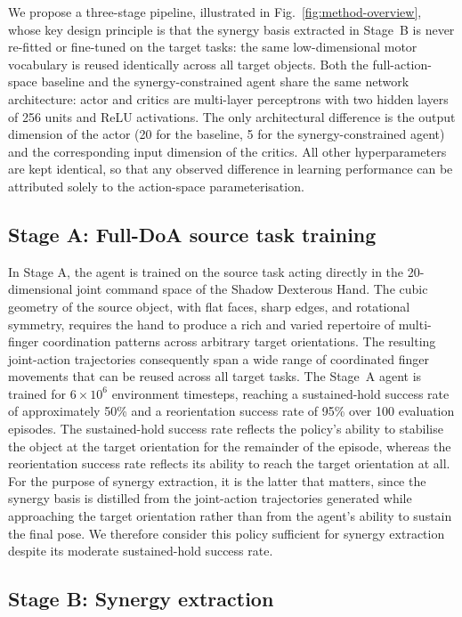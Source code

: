 \documentclass[letterpaper, 10 pt, conference]{ieeeconf}  %
\begin{document}
We propose a three-stage pipeline, illustrated in 
Fig.~\ref{fig:method-overview}, whose key design principle is that the 
synergy basis extracted in Stage~B is never re-fitted or fine-tuned on 
the target tasks: the same low-dimensional motor vocabulary is reused 
identically across all target objects. Both the full-action-space 
baseline and the synergy-constrained agent share the same network 
architecture: actor and critics are multi-layer perceptrons with two 
hidden layers of 256 units and ReLU activations. The only architectural 
difference is the output dimension of the actor (20 for the baseline, 
5 for the synergy-constrained agent) and the corresponding input 
dimension of the critics. All other hyperparameters are kept identical, 
so that any observed difference in learning performance can be attributed 
solely to the action-space parameterisation.

\subsection{Stage A: Full-DoA source task training}

In Stage A, the agent is trained on the source task acting directly in the 20-dimensional joint command space of the Shadow Dexterous Hand. The cubic geometry of the source object, with flat faces, sharp edges, 
and rotational symmetry, requires the hand to produce a rich and 
varied repertoire of multi-finger coordination patterns across arbitrary 
target orientations. The resulting joint-action trajectories consequently span a wide range of coordinated finger movements that can be reused across all target tasks. The Stage~A agent is trained for $6 \times 10^6$ environment
timesteps, reaching a sustained-hold success rate of approximately 50\%
and a reorientation success rate of 95\% over 100 evaluation episodes. The sustained-hold success rate reflects the policy's ability to stabilise the object at the target orientation for the remainder of the episode, whereas the reorientation success rate reflects its ability to reach the target orientation at all. For the purpose of synergy extraction, it is the latter that matters, since the synergy basis is distilled from the joint-action trajectories generated while approaching the target orientation rather than from the agent's ability to sustain the final pose. We therefore consider this policy sufficient for synergy extraction despite its moderate sustained-hold success rate.


\subsection{Stage B: Synergy extraction}
\end{document}

